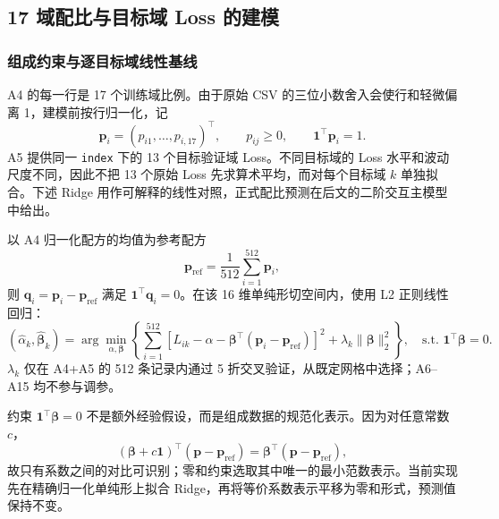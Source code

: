 \subsection{17 域配比与目标域 Loss 的建模}

\subsubsection{组成约束与逐目标域线性基线}

A4 的每一行是 17 个训练域比例。由于原始 CSV 的三位小数舍入会使行和轻微偏离 1，建模前按行归一化，记
\begin{equation}
\boldsymbol p_i=(p_{i1},\ldots,p_{i,17})^\top,
\qquad
p_{ij}\ge 0,\qquad
\boldsymbol 1^\top\boldsymbol p_i=1.
\label{eq:q1_simplex}
\end{equation}
A5 提供同一 \texttt{index} 下的 13 个目标验证域 Loss。不同目标域的 Loss 水平和波动尺度不同，因此不把 13 个原始 Loss 先求算术平均，而对每个目标域 $k$ 单独拟合。下述 Ridge 用作可解释的线性对照，正式配比预测在后文的二阶交互主模型中给出。

以 A4 归一化配方的均值为参考配方
\begin{equation}
\boldsymbol p_{\mathrm{ref}}
=
\frac{1}{512}\sum_{i=1}^{512}\boldsymbol p_i,
\label{eq:q1_pref}
\end{equation}
则 $\boldsymbol q_i=\boldsymbol p_i-\boldsymbol p_{\mathrm{ref}}$ 满足 $\boldsymbol 1^\top\boldsymbol q_i=0$。在该 16 维单纯形切空间内，使用 L2 正则线性回归\cite{regmix2025}：
\begin{equation}
(\widehat\alpha_k,\widehat{\boldsymbol\beta}_k)
=
\arg\min_{\alpha,\boldsymbol\beta}
\left\{
\sum_{i=1}^{512}
\left[
L_{ik}-\alpha-\boldsymbol\beta^\top
(\boldsymbol p_i-\boldsymbol p_{\mathrm{ref}})
\right]^2
+
\lambda_k\|\boldsymbol\beta\|_2^2
\right\},
\quad
\text{s.t. }\boldsymbol 1^\top\boldsymbol\beta=0.
\label{eq:q1_constrained_ridge}
\end{equation}
$\lambda_k$ 仅在 A4+A5 的 512 条记录内通过 5 折交叉验证，从既定网格中选择；A6--A15 均不参与调参。

约束 $\boldsymbol 1^\top\boldsymbol\beta=0$ 不是额外经验假设，而是组成数据的规范化表示。因为对任意常数 $c$，
\[
(\boldsymbol\beta+c\boldsymbol 1)^\top
(\boldsymbol p-\boldsymbol p_{\mathrm{ref}})
=
\boldsymbol\beta^\top
(\boldsymbol p-\boldsymbol p_{\mathrm{ref}}),
\]
故只有系数之间的对比可识别；零和约束选取其中唯一的最小范数表示。当前实现先在精确归一化单纯形上拟合 Ridge，再将等价系数表示平移为零和形式，预测值保持不变。

